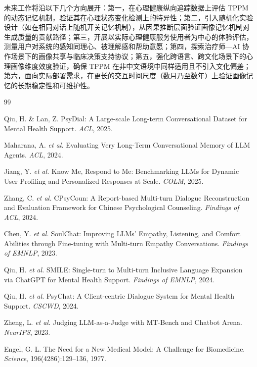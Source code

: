 \documentclass[12pt,a4paper]{article}
\begin{document}
未来工作将沿以下几个方向展开：第一，在心理健康纵向追踪数据上评估 TPPM 的动态记忆机制，验证其在心理状态变化检测上的特异性；第二，引入随机化实验设计（如在相同对话上随机开关记忆机制），从因果推断层面验证画像记忆机制对生成质量的贡献路径；第三，开展以实际心理健康服务使用者为中心的体验评估，测量用户对系统的感知同理心、被理解感和帮助意愿；第四，探索治疗师—AI 协作场景下的画像共享与临床决策支持协议；第五，强化跨语言、跨文化场景下的心理画像维度效度验证，确保 TPPM 在非中文语境中同样适用且不引入文化偏差；第六，面向实际部署需求，在更长的交互时间尺度（数月乃至数年）上验证画像记忆的长期稳定性和可维护性。


\begin{thebibliography}{99}

Qiu, H. \& Lan, Z. PsyDial: A Large-scale Long-term Conversational Dataset for Mental Health Support. \textit{ACL}, 2025.

Maharana, A. \textit{et al.} Evaluating Very Long-Term Conversational Memory of LLM Agents. \textit{ACL}, 2024.

Jiang, Y. \textit{et al.} Know Me, Respond to Me: Benchmarking LLMs for Dynamic User Profiling and Personalized Responses at Scale. \textit{COLM}, 2025.

Zhang, C. \textit{et al.} CPsyCoun: A Report-based Multi-turn Dialogue Reconstruction and Evaluation Framework for Chinese Psychological Counseling. \textit{Findings of ACL}, 2024.

Chen, Y. \textit{et al.} SoulChat: Improving LLMs' Empathy, Listening, and Comfort Abilities through Fine-tuning with Multi-turn Empathy Conversations. \textit{Findings of EMNLP}, 2023.

Qiu, H. \textit{et al.} SMILE: Single-turn to Multi-turn Inclusive Language Expansion via ChatGPT for Mental Health Support. \textit{Findings of EMNLP}, 2024.

Qiu, H. \textit{et al.} PsyChat: A Client-centric Dialogue System for Mental Health Support. \textit{CSCWD}, 2024.

Zheng, L. \textit{et al.} Judging LLM-as-a-Judge with MT-Bench and Chatbot Arena. \textit{NeurIPS}, 2023.

Engel, G. L. The Need for a New Medical Model: A Challenge for Biomedicine. \textit{Science}, 196(4286):129--136, 1977.


\end{thebibliography}
\end{document}

